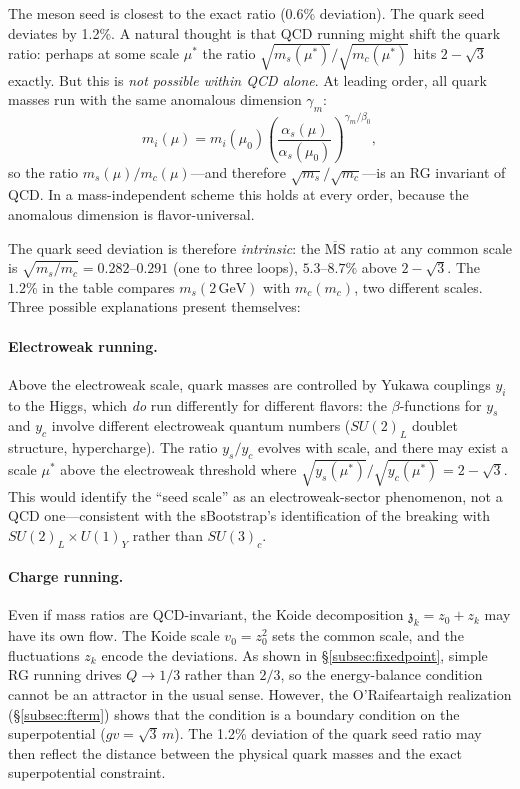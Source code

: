 \documentclass[12pt,a4paper]{article}
\newcommand{\GeV}{\,\text{GeV}}
\newcommand{\zch}{\mathfrak{z}}
\begin{document}
The meson seed is closest to the exact ratio (0.6\% deviation). 
The quark seed deviates by 1.2\%. A natural thought is that QCD 
running might shift the quark ratio: perhaps at some scale $\mu^*$ 
the ratio $\sqrt{m_s(\mu^*)}/\sqrt{m_c(\mu^*)}$ hits $2 - \sqrt{3}$ 
exactly. But this is \emph{not possible within QCD alone}. At leading 
order, all quark masses run with the same anomalous dimension 
$\gamma_m$:
\begin{equation}
m_i(\mu) = m_i(\mu_0)\left(\frac{\alpha_s(\mu)}{\alpha_s(\mu_0)}\right)^{\gamma_m/\beta_0},
\end{equation}
so the ratio $m_s(\mu)/m_c(\mu)$---and therefore
$\sqrt{m_s}/\sqrt{m_c}$---is an RG invariant of QCD. In a
mass-independent scheme this holds at every order, because the
anomalous dimension is flavor-universal.

The quark seed deviation is therefore \emph{intrinsic}: the
$\overline{\text{MS}}$ ratio at any common scale is
$\sqrt{m_s/m_c} = 0.282$--$0.291$ (one to three loops), $5.3$--$8.7\%$
above $2-\sqrt3$. The $1.2\%$ in the table compares $m_s(2\GeV)$ with
$m_c(m_c)$, two different scales. 
Three possible explanations present themselves:

\paragraph{Electroweak running.} Above the electroweak scale, 
quark masses are controlled by Yukawa couplings $y_i$ to the 
Higgs, which \emph{do} run differently for different flavors: 
the $\beta$-functions for $y_s$ and $y_c$ involve different 
electroweak quantum numbers ($SU(2)_L$ doublet structure, 
hypercharge). The ratio $y_s/y_c$ evolves with scale, and 
there may exist a scale $\mu^*$ above the electroweak 
threshold where $\sqrt{y_s(\mu^*)}/\sqrt{y_c(\mu^*)} = 2 - \sqrt{3}$. 
This would identify the ``seed scale'' as an electroweak-sector 
phenomenon, not a QCD one---consistent with the sBootstrap's 
identification of the breaking with $SU(2)_L \times U(1)_Y$ 
rather than $SU(3)_c$.

\paragraph{Charge running.} Even if mass ratios are QCD-invariant,
the Koide decomposition $\zch_k = z_0 + z_k$ may have its own
flow. The Koide scale $v_0 = z_0^2$ sets the common scale,
and the fluctuations $z_k$ encode the deviations. As shown in
\S\ref{subsec:fixedpoint}, simple RG running drives $Q \to 1/3$
rather than $2/3$, so the energy-balance condition cannot be an
attractor in the usual sense. However, the O'Raifeartaigh
realization (\S\ref{subsec:fterm}) shows that the condition is a
boundary condition on the superpotential ($gv = \sqrt{3}\,m$).
The 1.2\% deviation of the quark seed ratio may then reflect
the distance between the physical quark masses and the exact
superpotential constraint.
\end{document}
